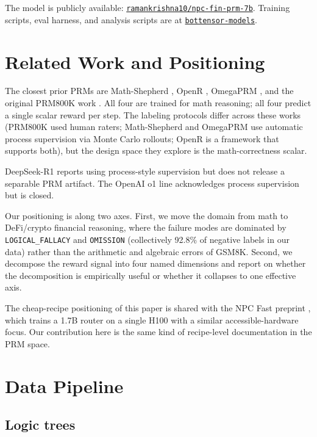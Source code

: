 \documentclass[10pt,letterpaper]{article}
\begin{document}
The model is publicly available: \href{https://huggingface.co/ramankrishna10/npc-fin-prm-7b}{\texttt{ramankrishna10/npc-fin-prm-7b}}. Training scripts, eval harness, and analysis scripts are at \href{https://github.com/ramankrishna/bottensor-models/tree/main/training/npc-fin-prm-7b}{\texttt{bottensor-models}}.

\section{Related Work and Positioning}
\label{sec:related}

The closest prior PRMs are Math-Shepherd \cite{wang2024mathshepherd}, OpenR \cite{wang2024openr}, OmegaPRM \cite{luo2024omegaprm}, and the original PRM800K work \cite{lightman2023verify}. All four are trained for math reasoning; all four predict a single scalar reward per step. The labeling protocols differ across these works (PRM800K used human raters; Math-Shepherd and OmegaPRM use automatic process supervision via Monte Carlo rollouts; OpenR is a framework that supports both), but the design space they explore is the math-correctness scalar.

DeepSeek-R1 \cite{deepseek2025r1} reports using process-style supervision but does not release a separable PRM artifact. The OpenAI o1 line acknowledges process supervision but is closed.

Our positioning is along two axes. First, we move the domain from math to DeFi/crypto financial reasoning, where the failure modes are dominated by \texttt{LOGICAL\_FALLACY} and \texttt{OMISSION} (collectively 92.8\% of negative labels in our data) rather than the arithmetic and algebraic errors of GSM8K. Second, we decompose the reward signal into four named dimensions and report on whether the decomposition is empirically useful or whether it collapses to one effective axis.

The cheap-recipe positioning of this paper is shared with the NPC Fast preprint \cite{bachu2026npcfast}, which trains a 1.7B router on a single H100 with a similar accessible-hardware focus. Our contribution here is the same kind of recipe-level documentation in the PRM space.

\section{Data Pipeline}
\label{sec:data}

\subsection{Logic trees}
\end{document}
